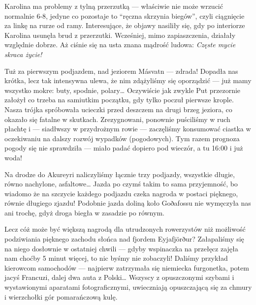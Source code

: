 
Karolina ma problemy z tylną przerzutką --- właściwie nie może wrzucić normalnie 6-8, jedyne co pozostaje to “ręczna skrzynia biegów”, czyli ciągnięcie za linkę na rurze od ramy. Interesujące, że objawy nasiliły się, gdy po interiorze Karolina usunęła brud z przerzutki. Wcześniej, mimo zapiaszczenia, działały względnie dobrze. Aż ciśnie się na usta znana mądrość ludowa: \emph{Częste mycie skraca życie!}

Tuż za pierwszym podjazdem, nad jeziorem Másvatn --- zdrada! Dopadła nas krótka, lecz tak intensywna ulewa, że nim zdążyliśmy się oporządzić --- już mamy wszystko mokre: buty, spodnie, polary… Oczywiście jak zwykle Put przezornie założył co trzeba na samiutkim początku, gdy tylko poczuł pierwsze krople. Nasza trójka spróbowała ucieczki przed deszczem na drugi brzeg jeziora, co okazało się  fatalne w skutkach. Zrezygnowani, ponownie puściliśmy w ruch płachtę i --- siadłwszy w przydrożnym rowie --- zaczęliśmy konsumować ciastka w oczekiwaniu na dalszy rozwój wypadków (pogodowych). Tym razem prognoza pogody się nie sprawdziła --- miało padać dopiero pod wieczór, a tu 16:00 i już woda!

Na drodze do Akureyri naliczyliśmy łącznie trzy podjazdy, wszystkie długie, równo nachylone, asfaltowe… Jazda po czymś takim to sama przyjemność, bo wiadomo że na szczycie każdego podjazdu czeka nagroda w postaci pięknego, równie długiego zjazdu! Podobnie jazda doliną koło Goðafossu nie wymęczyła nas ani trochę, gdyż droga biegła w zasadzie po równym.

Lecz cóż może być większą nagrodą dla utrudzonych rowerzystów niż możliwość podziwiania pięknego zachodu słońca nad fjordem Eyjafjörður? Załapaliśmy się na niego dosłownie w ostatniej chwili --- gdyby wspinaczka na przełęcz zajęła nam choćby 5 minut więcej, to nic byśmy nie zobaczyli! Daliśmy przykład kierowcom samochodów --- najpierw zatrzymała się niemiecka furgonetka, potem jacyś Francuzi, dalej dwa auta z Polski… Wszyscy z opuszczonymi szybami i wystawionymi aparatami fotograficznymi, uwieczniają opuszczającą się za chmury i wierzchołki gór pomarańczową kulę.


